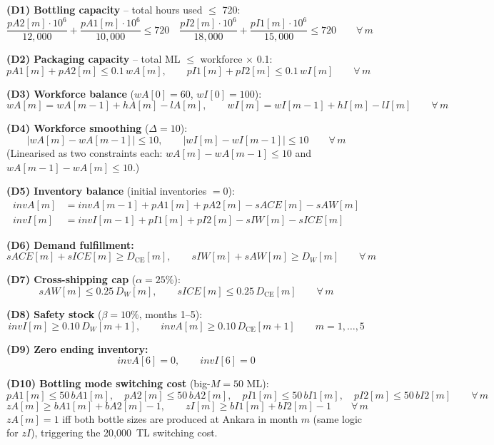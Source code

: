 \documentclass[12pt,a4paper]{article}
\begin{document}
\textbf{(D1) Bottling capacity} -- total hours used $\leq$ 720:
\[
\frac{pA2[m]\cdot10^6}{12{,}000}+\frac{pA1[m]\cdot10^6}{10{,}000}\leq720 \quad
\frac{pI2[m]\cdot10^6}{18{,}000}+\frac{pI1[m]\cdot10^6}{15{,}000}\leq720 \qquad \forall\,m
\]

\textbf{(D2) Packaging capacity} -- total ML $\leq$ workforce $\times$ 0.1:
\[
pA1[m]+pA2[m]\leq0.1\,wA[m], \qquad pI1[m]+pI2[m]\leq0.1\,wI[m] \qquad \forall\,m
\]

\textbf{(D3) Workforce balance} ($wA[0]=60$, $wI[0]=100$):
\[
wA[m]=wA[m-1]+hA[m]-lA[m], \qquad wI[m]=wI[m-1]+hI[m]-lI[m] \qquad \forall\,m
\]

\textbf{(D4) Workforce smoothing} ($\Delta=10$):
\[
|wA[m]-wA[m-1]|\leq10, \qquad |wI[m]-wI[m-1]|\leq10 \qquad \forall\,m
\]
(Linearised as two constraints each: $wA[m]-wA[m-1]\leq10$ and $wA[m-1]-wA[m]\leq10$.)

\textbf{(D5) Inventory balance} (initial inventories $=0$):
\begin{align*}
invA[m]&=invA[m-1]+pA1[m]+pA2[m]-sACE[m]-sAW[m]\\
invI[m]&=invI[m-1]+pI1[m]+pI2[m]-sIW[m]-sICE[m]
\end{align*}

\textbf{(D6) Demand fulfillment:}
\[
sACE[m]+sICE[m]\geq D_{\text{CE}}[m], \qquad sIW[m]+sAW[m]\geq D_W[m] \qquad \forall\,m
\]

\textbf{(D7) Cross-shipping cap} ($\alpha=25\%$):
\[
sAW[m]\leq0.25\,D_W[m], \qquad sICE[m]\leq0.25\,D_{\text{CE}}[m] \qquad \forall\,m
\]

\textbf{(D8) Safety stock} ($\beta=10\%$, months 1--5):
\[
invI[m]\geq0.10\,D_W[m+1], \qquad invA[m]\geq0.10\,D_{\text{CE}}[m+1] \qquad m=1,\dots,5
\]

\textbf{(D9) Zero ending inventory:}
\[
invA[6]=0, \qquad invI[6]=0
\]

\textbf{(D10) Bottling mode switching cost} (big-$M=50$ ML):
\[
pA1[m]\leq50\,bA1[m],\quad pA2[m]\leq50\,bA2[m],\quad
pI1[m]\leq50\,bI1[m],\quad pI2[m]\leq50\,bI2[m] \qquad \forall\,m
\]
\[
zA[m]\geq bA1[m]+bA2[m]-1, \qquad zI[m]\geq bI1[m]+bI2[m]-1 \qquad \forall\,m
\]
$zA[m]=1$ iff both bottle sizes are produced at Ankara in month $m$ (same logic for $zI$),
triggering the 20,000~TL switching cost.
\end{document}
